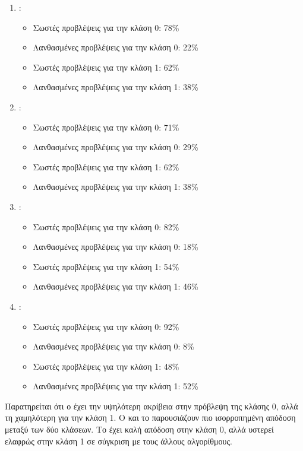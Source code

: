 \begin{enumerate}
  \item {}:
    \begin{itemize}
      \item Σωστές προβλέψεις για την κλάση 0: 78\%
      \item Λανθασμένες προβλέψεις για την κλάση 0: 22\%
      \item Σωστές προβλέψεις για την κλάση 1: 62\%
      \item Λανθασμένες προβλέψεις για την κλάση 1: 38\%
    \end{itemize}

  \item {}:
    \begin{itemize}
      \item Σωστές προβλέψεις για την κλάση 0: 71\%
      \item Λανθασμένες προβλέψεις για την κλάση 0: 29\%
      \item Σωστές προβλέψεις για την κλάση 1: 62\%
      \item Λανθασμένες προβλέψεις για την κλάση 1: 38\%
    \end{itemize}

  \item {}:
    \begin{itemize}
      \item Σωστές προβλέψεις για την κλάση 0: 82\%
      \item Λανθασμένες προβλέψεις για την κλάση 0: 18\%
      \item Σωστές προβλέψεις για την κλάση 1: 54\%
      \item Λανθασμένες προβλέψεις για την κλάση 1: 46\%
    \end{itemize}

  \item {}:
    \begin{itemize}
      \item Σωστές προβλέψεις για την κλάση 0: 92\%
      \item Λανθασμένες προβλέψεις για την κλάση 0: 8\%
      \item Σωστές προβλέψεις για την κλάση 1: 48\%
      \item Λανθασμένες προβλέψεις για την κλάση 1: 52\%
    \end{itemize}
\end{enumerate}

Παρατηρείται ότι ο  έχει την υψηλότερη ακρίβεια στην
πρόβλεψη της κλάσης 0, αλλά τη χαμηλότερη για την κλάση 1. Ο  και το  παρουσιάζουν πιο ισορροπημένη απόδοση μεταξύ των
δύο κλάσεων. Το  έχει καλή απόδοση στην κλάση 0,
αλλά υστερεί ελαφρώς στην κλάση 1 σε σύγκριση με τους άλλους αλγορίθμους.

